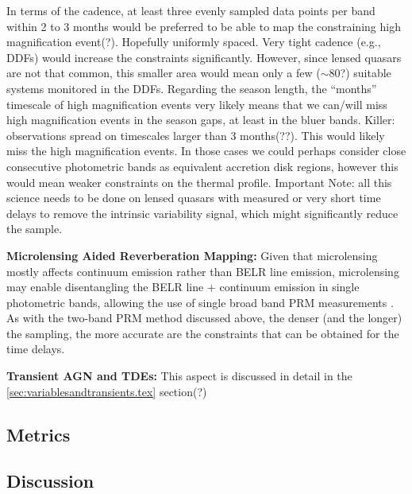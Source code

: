 In terms of the cadence, at least three evenly sampled data points per band within 2 to 3 months would be preferred to be able to map the constraining high magnification event(?). Hopefully uniformly spaced. Very tight cadence (e.g., DDFs) would increase the constraints significantly. However, since lensed quasars are not that common, this smaller area would mean only a few ($\sim80$?) suitable systems monitored in the DDFs.
%
Regarding the season length, the ``months'' timescale of high magnification events very likely means that we can/will miss high magnification events in the season gaps, at least in the bluer bands.
%
Killer: observations spread on timescales larger than 3 months(??). This would likely miss the high magnification events. In those cases we could perhaps consider close consecutive photometric bands as equivalent accretion disk regions, however this would mean weaker constraints on the thermal profile.
%
Important Note: all this science needs to be done on lensed quasars with measured or very short time delays to remove the intrinsic variability signal, which might significantly reduce the sample.

{\bf Microlensing Aided Reverberation Mapping:} Given that microlensing mostly affects continuum emission rather than BELR line emission, microlensing may enable disentangling the BELR line $+$ continuum emission in single photometric bands, allowing the use of single broad band PRM measurements \citep{SluseandTewes2014}. As with the two-band PRM method discussed above, the denser (and the longer) the sampling, the more accurate are the constraints that can be obtained for the time delays.

{\bf Transient AGN and TDEs:} This aspect is discussed in detail in the \autoref{sec:variablesandtransients.tex} section(?)


\subsection{Metrics}
\label{sec:\secname:metrics}



\subsection{Discussion}
\label{sec:\secname:discussion}


\navigationbar
